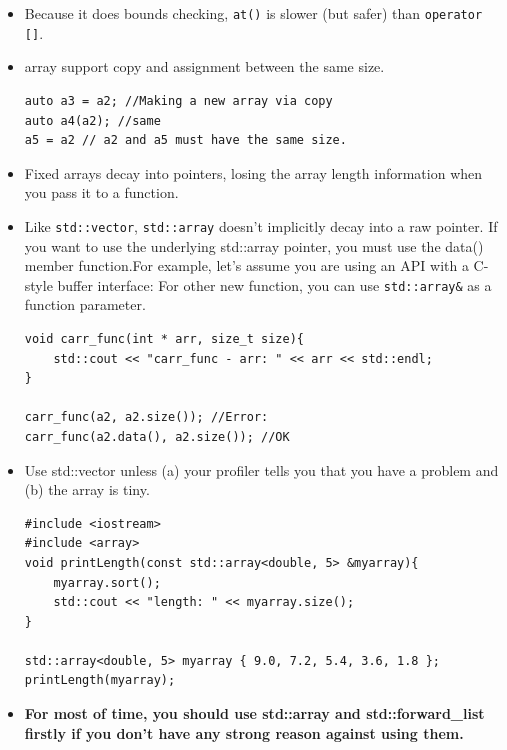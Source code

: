 \documentclass[a4paper,11pt,twoside]{book}
\begin{document}
\begin{itemize}
\item Because it does bounds checking, \texttt{at()} is slower (but safer) than \texttt{operator []}.

\item array support copy and assignment between the same size.
\begin{lstlisting}[numbers=none]
auto a3 = a2; //Making a new array via copy
auto a4(a2); //same
a5 = a2 // a2 and a5 must have the same size.
\end{lstlisting}


\item Fixed arrays decay into pointers, losing the array length information when you pass it to a function.

\item Like \texttt{std::vector}, \texttt{std::array} doesn't implicitly decay into a raw pointer. If you want to use the underlying std::array pointer, you must use the data() member function.For example, let's assume you are using an API with a C-style buffer interface: For other new function, you can use \texttt{std::array\&} as a function parameter. 

\begin{lstlisting}[numbers=none]
void carr_func(int * arr, size_t size){
    std::cout << "carr_func - arr: " << arr << std::endl;
}

carr_func(a2, a2.size()); //Error:
carr_func(a2.data(), a2.size()); //OK
\end{lstlisting}

\item Use std::vector unless (a) your profiler tells you that you have a problem and (b) the array is tiny.
\begin{lstlisting}[numbers=none]
#include <iostream>
#include <array>
void printLength(const std::array<double, 5> &myarray){
    myarray.sort();
    std::cout << "length: " << myarray.size();
}

std::array<double, 5> myarray { 9.0, 7.2, 5.4, 3.6, 1.8 };
printLength(myarray);
\end{lstlisting}


\item \textbf{For most of time, you should use std::array and std::forward\_list firstly if you don't have any strong reason against using them.} 
\end{itemize}
\end{document}
